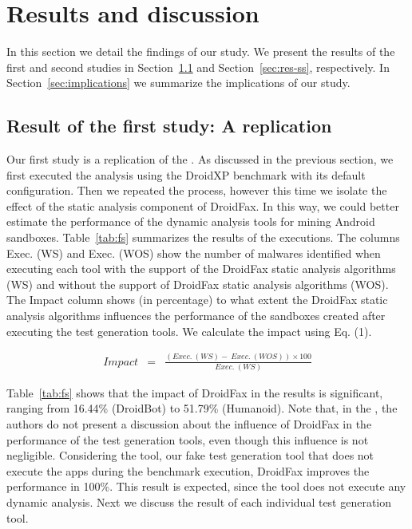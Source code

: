 \section{Results and discussion}

In this section we detail the findings of our study. We present the results of the first and
second studies in Section~\ref{sec:res-fs} and Section~\ref{sec:res-ss}, respectively. In Section~\ref{sec:implications} we summarize the
implications of our study. 

\subsection{Result of the first study: A \blls replication}\label{sec:res-fs}

Our first study is a replication of the \blls.
As discussed in the previous section, we first executed the analysis using the DroidXP benchmark with its default
configuration. Then we repeated the process, however this time we isolate the effect of the static analysis component of DroidFax. In this way, we could better estimate the performance of the dynamic analysis tools for mining Android sandboxes.
Table~\ref{tab:fs} summarizes the results of the executions. The columns Exec. (WS) and Exec. (WOS) 
show the number of malwares identified when executing each tool with the
support of the DroidFax static analysis algorithms (WS) and without the support
of DroidFax static analysis algorithms (WOS). 
The Impact column shows 
(in percentage) to what extent the DroidFax static analysis algorithms influences
the performance of the sandboxes created after
executing the test generation tools. We calculate the impact
using Eq. (1).

\begin{eqnarray}
Impact & = & \frac{(Exec.\ (WS) - \ Exec.\ (WOS)) \times 100}{Exec.\ (WS)} 
\end{eqnarray}  


Table~\ref{tab:fs} shows that the impact of DroidFax in the results is significant, ranging
from 16.44\% (DroidBot) to 51.79\% (Humanoid). Note that, in the \blls, the authors do not present a
discussion about the influence of DroidFax in the performance of the
test generation tools, even though this influence is not negligible. 
Considering the \joke
tool, our fake test generation tool that does not execute the apps during
the benchmark execution, DroidFax improves the performance in 100\%.
This result is expected, since the \joke tool does not execute any dynamic analysis.
Next we discuss the result of each individual test generation tool. 

